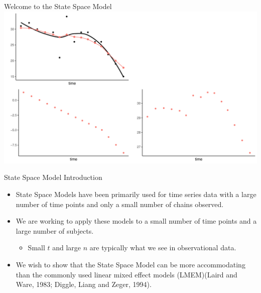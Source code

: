 \documentclass[
  ignorenonframetext,
]{beamer}
\providecommand{\tightlist}{%
  \setlength{\itemsep}{0pt}\setlength{\parskip}{0pt}}
\begin{document}
\begin{frame}{Welcome to the State Space Model}
\protect\hypertarget{welcome-to-the-state-space-model}{}
\includegraphics{Prez4_files/figure-beamer/unnamed-chunk-9-1.pdf}
\end{frame}

\begin{frame}{State Space Model Introduction}
\protect\hypertarget{state-space-model-introduction}{}
\begin{itemize}
\tightlist
\item
  State Space Models have been primarily used for time series data with
  a large number of time points and only a small number of chains
  observed.
\item
  We are working to apply these models to a small number of time points
  and a large number of subjects.

  \begin{itemize}
  \tightlist
  \item
    Small \(t\) and large \(n\) are typically what we see in
    observational data.
  \end{itemize}
\item
  We wish to show that the State Space Model can be more accommodating
  than the commonly used linear mixed effect models (LMEM)(Laird and
  Ware, 1983; Diggle, Liang and Zeger, 1994).
\end{itemize}
\end{frame}
\end{document}
